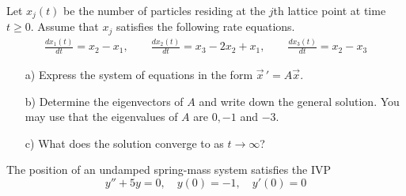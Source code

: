 \documentclass[12pt]{exam}
\begin{document}
\begin{questions}
        Let $x_j(t)$ be the number of particles residing at the $j$th lattice point at time $t \ge 0$. Assume that $x_j$ satisfies the following rate equations.
        \begin{align*} 
            \frac{dx_1(t)}{dt} = x_2 - x_1 , \qquad 
            \frac{dx_2(t)}{dt} = x_3 - 2 x_2 + x_1 , \qquad \frac{dx_3(t)}{dt} = x_2 - x_3
        \end{align*} 
        \begin{enumerate} 
            \item[a)] Express the system of equations in the form $\vec x \, ' = A \vec x$. 
                \vspace{2cm}

                \item[b)] Determine the eigenvectors of $A$ and write down the general solution. You may use that the eigenvalues of $A$ are $0, -1$ and $-3$. 
                \vspace{10cm} 
                \item[c)] What does the solution converge to as $t \to \infty$? 
        \end{enumerate}
        
    \newpage \InitialsRight
    \Scratch 
        
        
    \newpage \InitialsLeft
        
    \question[10] The position of an undamped spring-mass system satisfies the IVP $$y'' + 5y = 0, \quad y(0) = -1, \quad y'(0) = 0$$  
    

\end{questions}
\end{document}
